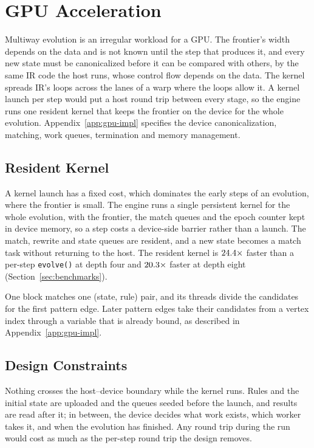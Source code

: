 \section{GPU Acceleration}
\label{sec:gpu}

Multiway evolution is an irregular workload for a GPU. The frontier's width depends on the data
and is not known until the step that produces it, and every new state must be canonicalized before
it can be compared with others, by the same IR code the host runs, whose control flow depends on
the data. The kernel spreads IR's loops across the lanes of a warp where the loops allow it. A
kernel launch per step would put a host round trip between every stage, so the engine runs one
resident kernel that keeps the frontier on the device for the whole evolution.
Appendix~\ref{app:gpu-impl} specifies the device canonicalization, matching, work queues,
termination and memory management.

\subsection{Resident Kernel}

A kernel launch has a fixed cost, which dominates the early steps of an evolution, where the
frontier is small. The engine runs a single persistent kernel for the whole evolution, with the
frontier, the match queues and the epoch counter kept in device memory, so a step costs a
device-side barrier rather than a launch. The match, rewrite and state queues are resident, and a
new state becomes a match task without returning to the host. The resident kernel is
$24.4\times$ faster than a per-step \texttt{evolve()} at depth four and
$20.3\times$ faster at depth eight (Section~\ref{sec:benchmarks}).

One block matches one (state, rule) pair, and its threads divide the candidates for the first
pattern edge. Later pattern edges take their candidates from a vertex index through a variable
that is already bound, as described in Appendix~\ref{app:gpu-impl}.

\subsection{Design Constraints}
\label{sec:gpu-constraint}

Nothing crosses the host--device boundary while the kernel runs. Rules and the initial state are
uploaded and the queues seeded before the launch, and results are read after it; in between, the
device decides what work exists, which worker takes it, and when the evolution has finished. Any
round trip during the run would cost as much as the per-step round trip the design removes.

